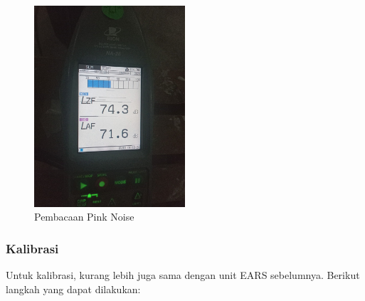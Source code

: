 \documentclass{article}
\begin{document}
\begin{itemize}
		\begin{figure}[H]
			\centering
			\includegraphics[width=0.5\textwidth,angle=0]{images/3dio_slm_pinknoise}
			\caption{Pembacaan Pink Noise}
		\end{figure}
	\end{itemize}

	\subsubsection{Kalibrasi}

	Untuk kalibrasi, kurang lebih juga sama dengan unit EARS sebelumnya.
	Berikut langkah yang dapat dilakukan:
\end{document}
